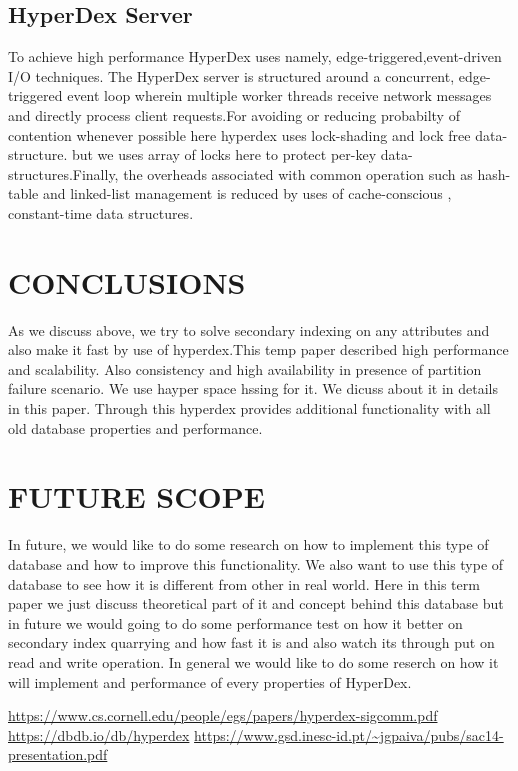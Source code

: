 \documentclass[13pt]{article}
\begin{document}
\subsection{ HyperDex Server}
To achieve high performance HyperDex uses namely, edge-triggered,event-driven I/O techniques. The HyperDex server is structured around a concurrent, edge-triggered event loop wherein multiple worker threads receive network messages and directly process client requests.For avoiding or reducing probabilty of contention whenever possible here hyperdex uses lock-shading and lock free data-structure. but we uses array of locks here to protect per-key data-structures.Finally, the overheads associated with common operation such as hash-table and linked-list management  is reduced by uses of cache-conscious , constant-time data structures. 

\section{\textcolor{BurntOrange}{CONCLUSIONS}}
As we discuss above, we try to solve secondary indexing on any attributes and  also make it fast by use of hyperdex.This temp paper described high performance and scalability. Also consistency   and high availability in presence of partition failure scenario. We use hayper space hssing for it. We dicuss about it in details in this paper. Through this hyperdex provides additional functionality with all old database properties and performance.
\section{\textcolor{BurntOrange}{FUTURE SCOPE }}
 In future, we would like to do some research on how to implement this type of database and how to improve this functionality. We also want to use this type of database to see how it is different from other in real world. Here in this term paper we just discuss theoretical part of it and concept behind this database but in future we would going to do some performance test on how it better on secondary index quarrying  and how fast it is and also watch its through put on read and write operation. In general we would like to do some reserch on how it will implement and performance of every properties  of HyperDex. 
 
 



\begin{thebibliography}{}
 \url{https://www.cs.cornell.edu/people/egs/papers/hyperdex-sigcomm.pdf}
 \url{https://dbdb.io/db/hyperdex}
 \url{https://www.gsd.inesc-id.pt/~jgpaiva/pubs/sac14-presentation.pdf}
\end{thebibliography}
\end{document}
